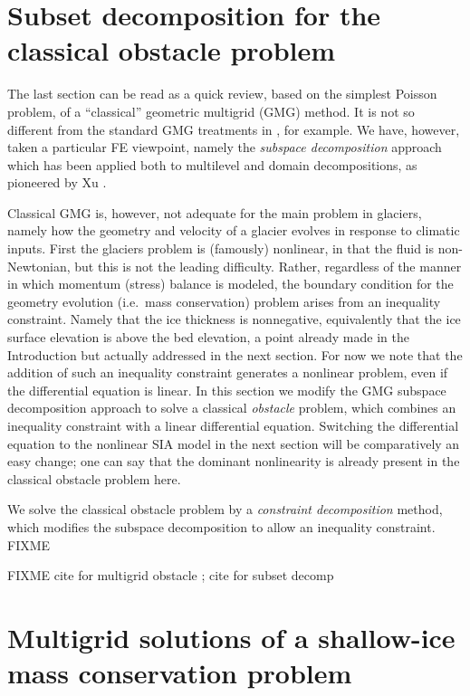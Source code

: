 \documentclass[letterpaper,final,12pt,reqno]{amsart}
\begin{document}
\section{Subset decomposition for the classical obstacle problem} \label{sec:obstacle}

The last section can be read as a quick review, based on the simplest Poisson problem, of a ``classical'' geometric multigrid (GMG) method.  It is not so different from the standard GMG treatments in \cite{Briggsetal2000,Bueler2021,Trottenbergetal2001}, for example.  We have, however, taken a particular FE viewpoint, namely the \emph{subspace decomposition} approach which has been applied both to multilevel and domain decompositions, as pioneered by Xu \cite{Xu1992}.

Classical GMG is, however, not adequate for the main problem in glaciers, namely how the geometry and velocity of a glacier evolves in response to climatic inputs.  First the glaciers problem is (famously) nonlinear, in that the fluid is non-Newtonian, but this is not the leading difficulty.  Rather, regardless of the manner in which momentum (stress) balance is modeled, the boundary condition for the geometry evolution (i.e.~mass conservation) problem arises from an inequality constraint.  Namely that the ice thickness is nonnegative, equivalently that the ice surface elevation is above the bed elevation, a point already made in the Introduction but actually addressed in the next section.  For now we note that the addition of such an inequality constraint generates a nonlinear problem, even if the differential equation is linear.  In this section we modify the GMG subspace decomposition approach to solve a classical \emph{obstacle} problem, which combines an inequality constraint with a linear differential equation.  Switching the differential equation to the nonlinear SIA model in the next section will be comparatively an easy change; one can say that the dominant nonlinearity is already present in the classical obstacle problem here.

We solve the classical obstacle problem by a \emph{constraint decomposition} \cite{Tai2003} method, which modifies the subspace decomposition to allow an inequality constraint.  FIXME

FIXME cite for multigrid obstacle \cite{BrandtCryer1983,Bueler2021,GraeserKornhuber2009,Jouvetetal2013}; cite for subset decomp \cite{Tai2003}


\section{Multigrid solutions of a shallow-ice mass conservation problem} \label{sec:sia}
\end{document}
